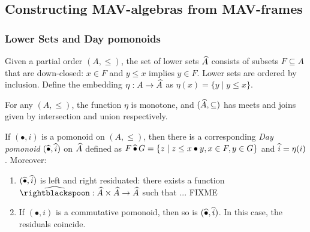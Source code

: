 \begin{remark}
\end{remark}

\begin{proposition}
\end{proposition}

\subsection{Constructing MAV-algebras from MAV-frames}


\subsubsection{Lower Sets and Day pomonoids}

\begin{definition}
  Given a partial order $(A, \leq)$, the set of lower sets
  $\widehat{A}$ consists of subsets $F \subseteq A$ that are
  down-closed: $x \in F$ and $y \leq x$ implies $y \in F$. Lower sets
  are ordered by inclusion. Define the embedding
  $\eta : A \to \widehat{A}$ as $\eta(x) = \{ y \mid y \leq x \}$.
\end{definition}

\begin{proposition}
  For any $(A, \leq)$, the function $\eta$ is monotone, and
  $(\widehat{A}, \subseteq)$ has meets and joins given by
  intersection and union respectively.

\end{proposition}

\begin{proposition}\label{prop:day-construction}
  If $(\bullet, i)$ is a pomonoid on $(A, \leq)$, then there is a
  corresponding \emph{Day pomonoid} $(\mathop{\widehat{\bullet}}, \mathop{\widehat{i}})$ on
  $\widehat{A}$ defined as
  $F \mathop{\widehat{\bullet}} G = \{ z \mid z \leq x \bullet y, x \in F, y \in G
  \}$ and $\mathop{\widehat{i}} = \eta(i)$. Moreover:
  \begin{enumerate}
  \item $(\mathop{\widehat{\bullet}}, \mathop{\widehat{i}})$ is left and right residuated: there
    exists a function
    $\Day{\rightblackspoon} : \LowerSet{A} \times \LowerSet{A} \to
    \LowerSet{A}$ such that ... FIXME
  \item If $(\bullet, i)$ is a commutative pomonoid, then so is
    $(\mathop{\widehat{\bullet}}, \mathop{\widehat{i}})$. In this case, the residuals coincide.
  \end{enumerate}
\end{proposition}

